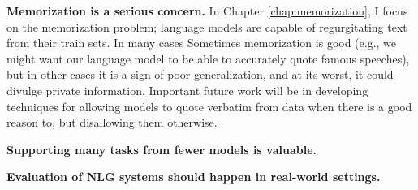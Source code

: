 \textbf{Memorization is a serious concern.}
	In Chapter \ref{chap:memorization}, I focus on the memorization problem; language models are capable of regurgitating text from their train sets.
	In many cases 
	Sometimes memorization is good (e.g., we might want our language model to be able to accurately quote famous speeches), but in other cases it is a sign of poor generalization, and at its worst, it could divulge private information.
	Important future work will be in developing techniques for allowing models to quote verbatim from data when there is a good reason to, but disallowing them otherwise.

\textbf{Supporting many tasks from fewer models is valuable.}
	\TODO{}

\textbf{Evaluation of NLG systems should happen in real-world settings.}
	\TODO{}

